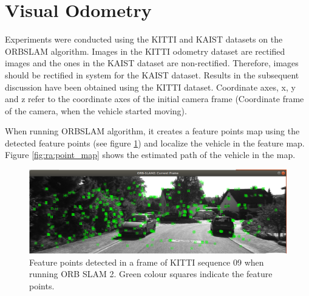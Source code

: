 \section{Visual Odometry}
\label{sec:VisualOdometry}

Experiments were conducted using the \gls{KITTI} and \gls{KAIST} datasets on the \gls{ORBSLAM} algorithm. Images in the \gls{KITTI} odometry dataset are rectified images and the ones in the \gls{KAIST} dataset are non-rectified. Therefore, images should be rectified in system for the \gls{KAIST} dataset. Results in the subsequent discussion have been obtained using the \gls{KITTI} dataset. Coordinate axes, x, y and z refer to the coordinate axes of the initial camera frame (Coordinate frame of the camera, when the vehicle started moving).

When running \gls{ORBSLAM} algorithm, it creates a feature points map using the detected feature points (see figure \ref{fig:ra:detected_features}) and localize the vehicle in the feature map. Figure \ref{fig:ra:point_map} shows the estimated path of the vehicle in the map.
\begin{figure}[htp]
	\centering
	\includegraphics[width=\textwidth]{figs/detected_features.png}
	\vspace{-0.5cm}
	\caption[Detected feature points]{Feature points detected in a frame of KITTI sequence 09 when running ORB SLAM 2. Green colour squares indicate the feature points.}
	\label{fig:ra:detected_features}
	\vspace{0.5cm}
\end{figure}
